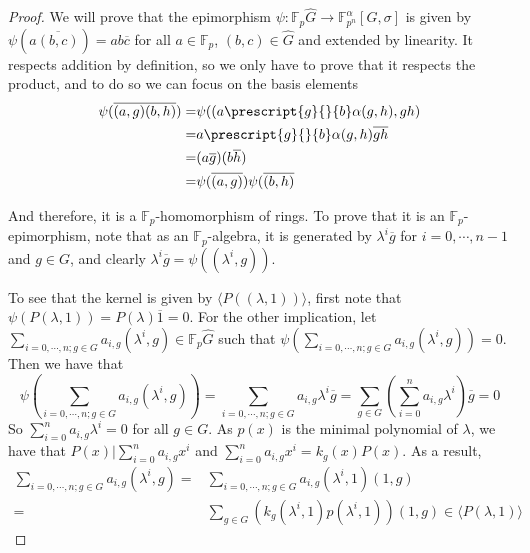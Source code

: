 \documentclass{article}
\begin{document}
\begin{proof}
We will prove that the epimorphism $\psi :\mathbb{F}_p \hat{G}  \longrightarrow \mathbb{F}_{p^n}^\alpha[G,\sigma]$ is given by $\psi(a \overline{(b,c)}) = ab \overline{c}$ for all $a\in \mathbb{F}_p$, $(b,c) \in \hat{G}$ and extended by linearity. It respects addition by definition, so we only have to prove that it respects the product, and to do so we can focus on the basis elements
\begin{align*}
        \psi(\overline{(a,g)} \overline{(b,h)} ) =&  \psi(  (a \prescript{g}{}{b} \alpha(g,h) , gh)  \\ =&  a \prescript{g}{}{b} \alpha(g,h) \overline{gh}  \\ =& ( a\overline{g} ) ( b \overline{h} )  \\ =& \psi(\overline{(a,g)}) \psi ( \overline{(b,h)}
\end{align*}

And therefore, it is a $\mathbb{F}_p$-homomorphism of rings. To prove that it is an $\mathbb{F}_p$-epimorphism, note that as an $\mathbb{F}_p$-algebra, it is generated by $\lambda^i\overline{g}$ for $i=0,\cdots, n-1$ and $g\in G$, and clearly $\lambda^i\overline{g} = \psi((\lambda^i,g))$.

To see that the kernel is given by $\langle P((\lambda,1)) \rangle$, first note that $\psi ( P(\lambda,1)) = P(\lambda) \overline{1} = 0$. For the other implication, let $\sum_{i=0,\cdots, n; g\in G}a_{i,g} ( \lambda^i, g) \in \mathbb{F}_p \hat{G} $ such that $\psi( \sum_{i=0,\cdots, n; g\in G}a_{i,g} ( \lambda^i, g) ) = 0$. Then we have that 
\begin{equation*}
    \psi \left(\sum_{i=0,\cdots, n; g\in G}a_{i,g} ( \lambda^i, g) \right) = \sum_{i=0,\cdots, n; g\in G}a_{i,g}  \lambda^i \overline{g} = \sum_{g\in G} \left(\sum_{i=0}^n  a_{i,g} \lambda^i \right) \overline{g} = 0
\end{equation*}
So $\sum_{i=0}^n  a_{i,g} \lambda^i =0$ for all $g\in G$. As $p(x) $ is the minimal polynomial of $\lambda$, we have that $P(x) | \sum_{i=0}^n  a_{i,g} x^i$ and $\sum_{i=0}^n  a_{i,g} x^i = k_g(x)P(x)$. As a result, 
\begin{align*}
    \sum_{i=0,\cdots, n; g\in G}a_{i,g} ( \lambda^i, g) = & \sum_{i=0,\cdots, n; g\in G}a_{i,g} ( \lambda^i, 1)  (1,g)\\ = & \sum_{g\in G} \left( k_g( \lambda^i, 1) p( \lambda^i, 1) \right) (1,g) \in \langle P(\lambda,1)\rangle
\end{align*}
\end{proof}
\end{document}
